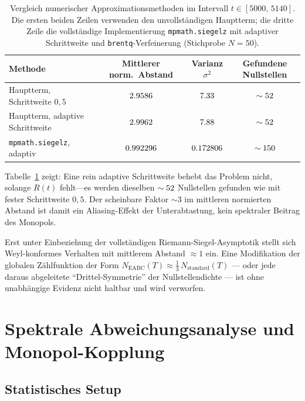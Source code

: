 \begin{table}[htbp]
\centering
\caption{Vergleich numerischer Approximationsmethoden im Intervall $t \in [5000,\,5140]$.
Die ersten beiden Zeilen verwenden den unvollständigen Hauptterm; die dritte Zeile die
vollständige Implementierung \texttt{mpmath.siegelz} mit adaptiver Schrittweite
und \texttt{brentq}-Verfeinerung (Stichprobe $N=50$).}
\label{tab:siegel_vergleich}
\begin{tabular}{lccc}
\toprule
\textbf{Methode} &
\textbf{Mittlerer norm.\ Abstand} &
\textbf{Varianz $\sigma^2$} &
\textbf{Gefundene Nullstellen} \\
\midrule
Hauptterm, Schrittweite $0{,}5$ &
$2.9586$ & $7.33$ & $\sim52$ \\
Hauptterm, adaptive Schrittweite &
$2.9962$ & $7.88$ & $\sim52$ \\
\texttt{mpmath.siegelz}, adaptiv &
$0.992296$ & $0.172806$ & $\sim150$ \\
\bottomrule
\end{tabular}
\end{table}

Tabelle~\ref{tab:siegel_vergleich} zeigt: Eine rein adaptive Schrittweite behebt das
Problem nicht, solange $R(t)$ fehlt---es werden dieselben $\sim52$ Nullstellen
gefunden wie mit fester Schrittweite $0{,}5$.
Der scheinbare Faktor $\sim 3$ im mittleren normierten Abstand ist damit ein
Aliasing-Effekt der Unterabtastung, kein spektraler Beitrag des Monopols.

Erst unter Einbeziehung der vollständigen Riemann-Siegel-Asymptotik stellt sich
Weyl-konformes Verhalten mit mittlerem Abstand $\approx 1$ ein.
Eine Modifikation der globalen Zählfunktion der Form
$N_{\mathrm{EABC}}(T) \approx \tfrac{1}{3}\,N_{\mathrm{standard}}(T)$
--- oder jede daraus abgeleitete ``Drittel-Symmetrie'' der Nullstellendichte ---
ist ohne unabhängige Evidenz nicht haltbar und wird verworfen.

\section{Spektrale Abweichungsanalyse und Monopol-Kopplung}
\label{sec:spektrale-abweichung}

\subsection{Statistisches Setup}

